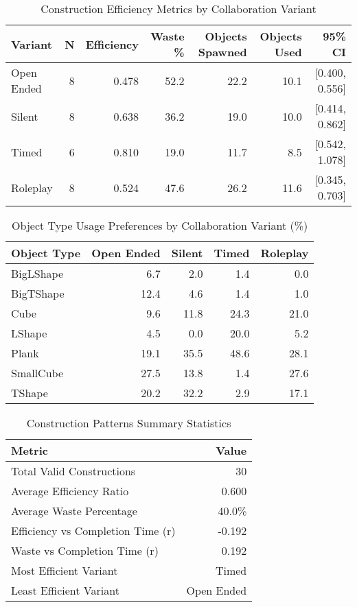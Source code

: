 \begin{table}[htbp]
\centering
\caption{Construction Efficiency Metrics by Collaboration Variant}
\label{tab:construction_efficiency}
\begin{tabular}{lrrrrrr}
\toprule
\textbf{Variant} & \textbf{N} & \textbf{Efficiency} & \textbf{Waste \%} & \textbf{Objects Spawned} & \textbf{Objects Used} & \textbf{95\% CI} \\
\midrule
Open Ended & 8 & 0.478 & 52.2 & 22.2 & 10.1 & [0.400, 0.556] \\
Silent & 8 & 0.638 & 36.2 & 19.0 & 10.0 & [0.414, 0.862] \\
Timed & 6 & 0.810 & 19.0 & 11.7 & 8.5 & [0.542, 1.078] \\
Roleplay & 8 & 0.524 & 47.6 & 26.2 & 11.6 & [0.345, 0.703] \\
\bottomrule
\end{tabular}
\end{table}

\begin{table}[htbp]
\centering
\caption{Object Type Usage Preferences by Collaboration Variant (\%)}
\label{tab:object_preferences}
\begin{tabular}{lrrrr}
\toprule
\textbf{Object Type} & \textbf{Open Ended} & \textbf{Silent} & \textbf{Timed} & \textbf{Roleplay} \\
\midrule
BigLShape & 6.7 & 2.0 & 1.4 & 0.0 \\
BigTShape & 12.4 & 4.6 & 1.4 & 1.0 \\
Cube & 9.6 & 11.8 & 24.3 & 21.0 \\
LShape & 4.5 & 0.0 & 20.0 & 5.2 \\
Plank & 19.1 & 35.5 & 48.6 & 28.1 \\
SmallCube & 27.5 & 13.8 & 1.4 & 27.6 \\
TShape & 20.2 & 32.2 & 2.9 & 17.1 \\
\bottomrule
\end{tabular}
\end{table}

\begin{table}[htbp]
\centering
\caption{Construction Patterns Summary Statistics}
\label{tab:construction_summary}
\begin{tabular}{lr}
\toprule
\textbf{Metric} & \textbf{Value} \\
\midrule
Total Valid Constructions & 30 \\
Average Efficiency Ratio & 0.600 \\
Average Waste Percentage & 40.0\% \\
\midrule
Efficiency vs Completion Time (r) & -0.192 \\
Waste vs Completion Time (r) & 0.192 \\
\midrule
Most Efficient Variant & Timed \\
Least Efficient Variant & Open Ended \\
\bottomrule
\end{tabular}
\end{table}